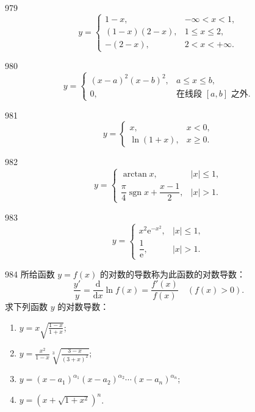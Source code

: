 
\begin{prob}[M]{979}
\[
y = \begin{cases}
1 - x, & -\infty < x < 1, \\
(1 - x)(2 - x), & 1 \leqslant x \leqslant 2, \\
-(2 - x), & 2 < x < +\infty.
\end{cases}
\]
\end{prob}

\begin{prob}[M]{980}
\[
y = \begin{cases}
(x - a)^2 (x - b)^2, & a \leqslant x \leqslant b, \\
0, & \text{在线段 } [a, b] \text{ 之外}.
\end{cases}
\]
\end{prob}

\begin{prob}[M]{981}
\[
y = \begin{cases}
x, & x < 0, \\
\ln(1 + x), & x \geqslant 0.
\end{cases}
\]
\end{prob}

\begin{prob}[M]{982}
\[
y = \begin{cases}
\arctan x, & |x| \leqslant 1, \\
\dfrac{\pi}{4} \operatorname{sgn} x + \dfrac{x - 1}{2}, & |x| > 1.
\end{cases}
\]
\end{prob}

\begin{prob}[M]{983}
\[
y = \begin{cases}
x^2 \mathrm{e}^{-x^2}, & |x| \leqslant 1, \\
\dfrac{1}{\mathrm{e}}, & |x| > 1.
\end{cases}
\]
\end{prob}

\begin{prob}[L]{984}
所给函数 $y = f(x)$ 的对数的导数称为此函数的对数导数：
\[
\frac{y'}{y} = \frac{\mathrm{d}}{\mathrm{d}x} \ln f(x) = \frac{f'(x)}{f(x)} \quad (f(x) > 0).
\]
求下列函数 $y$ 的对数导数：
\begin{enumerate}[label=(\alph*), itemsep=2pt, topsep=3pt]
\item $y = x \sqrt{\frac{1 - x}{1 + x}}$;
\item $y = \frac{x^2}{1 - x} \sqrt[3]{\frac{3 - x}{(3 + x)^2}}$;
\item $y = (x - a_1)^{\alpha_1} (x - a_2)^{\alpha_2} \cdots (x - a_n)^{\alpha_n}$;
\item $y = \left(x + \sqrt{1 + x^2}\right)^n$.
\end{enumerate}
\end{prob}

